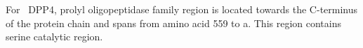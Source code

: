 For~ DPP4, prolyl oligopeptidase family region is located towards the C-terminus of the protein chain and spans from amino acid 559 to a. This region contains serine catalytic region.  